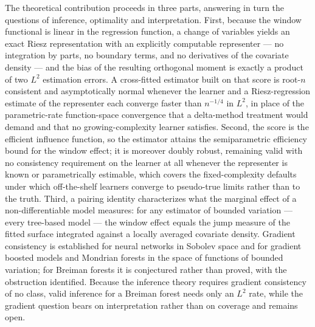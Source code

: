 \documentclass[12pt,a4paper]{article}
\numberwithin{equation}{section}
\theoremstyle{plain}
\theoremstyle{definition}
\begin{document}
	The theoretical contribution proceeds in three parts, answering in turn the
	questions of inference, optimality and interpretation. First, because the
	window functional is linear in the regression function, a change of variables
	yields an exact Riesz representation with an explicitly computable
	representer --- no integration by parts, no boundary terms, and no
	derivatives of the covariate density --- and the bias of the resulting
	orthogonal moment is exactly a product of two $L^2$ estimation errors. A
	cross-fitted estimator built on that score is root-$n$ consistent and
	asymptotically normal whenever the learner and a Riesz-regression estimate of
	the representer each converge faster than $n^{-1/4}$ in $L^2$, in place of
	the parametric-rate function-space convergence that a delta-method treatment
	would demand and that no growing-complexity learner satisfies. Second, the
	score is the efficient influence function, so the estimator attains the
	semiparametric efficiency bound for the window effect; it is moreover doubly
	robust, remaining valid with no consistency requirement on the learner at all
	whenever the representer is known or parametrically estimable, which covers
	the fixed-complexity defaults under which off-the-shelf learners converge to
	pseudo-true limits rather than to the truth. Third, a pairing identity
	characterizes what the marginal effect of a non-differentiable model
	measures: for any estimator of bounded variation --- every tree-based model
	--- the window effect equals the jump measure of the fitted surface
	integrated against a locally averaged covariate density. Gradient consistency
	is established for neural networks in Sobolev space and for gradient boosted
	models and Mondrian forests \citep{lakshminarayanan2014mondrian,
	mourtada2017mondrian} in the space of functions of bounded variation; for
	Breiman forests \citep{breiman2001rf, scornet2015forests} it is conjectured
	rather than proved, with the obstruction identified. Because the inference
	theory requires gradient consistency of no class, valid inference for a
	Breiman forest needs only an $L^2$ rate, while the gradient question bears on
	interpretation rather than on coverage and remains open.
	
\end{document}
